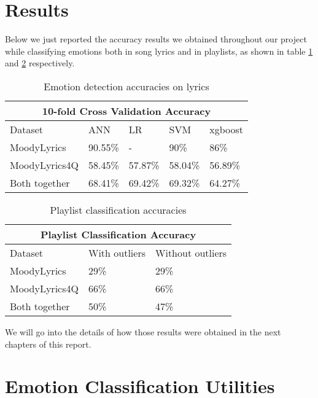 \section{Results}

Below we just reported the accuracy results we obtained throughout our project while classifying emotions both in song lyrics and in playlists, as shown in table \ref{tab:compar} and \ref{tab:compar2} respectively.

\begin{table}[H]
\centering
\begin{tabular}{ |p{3cm}||p{1.5cm}|p{1.5cm}|p{1.5cm}|p{1.5cm}|  }
 \hline
 \multicolumn{5}{|c|}{10-fold Cross Validation Accuracy} \\
 \hline
 Dataset & ANN & LR &SVM & xgboost\\
 \hline
MoodyLyrics  & 90.55\%    &- &  90\% & 86\%\\
MoodyLyrics4Q  & 58.45\%    &57.87\% &  58.04\% & 56.89\%\\
Both together &   68.41\%  & 69.42\%   &69.32\% &64.27\%\\
\hline
\end{tabular}
\caption{Emotion detection accuracies on lyrics} \label{tab:compar}
\end{table}

\begin{table}[H]
\centering
\begin{tabular}{ |p{3cm}||p{1.5cm}|p{1.5cm}| }
 \hline
 \multicolumn{3}{|c|}{Playlist Classification Accuracy} \\
 \hline
Dataset & With outliers & Without outliers\\
 \hline
MoodyLyrics & 29\% & 29\%\\
MoodyLyrics4Q  & 66\%    &66\%\\
Both together &   50\%  & 47\%\\
\hline
\end{tabular}
\caption{Playlist classification accuracies} \label{tab:compar2}
\end{table}

We will go into the details of how those results were obtained in the next chapters of this report.

\section{Emotion Classification Utilities}

